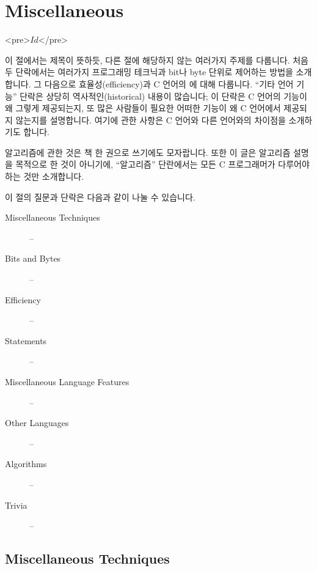 \chapter{Miscellaneous}	\label{chap:misc}

\begin{rawhtml}
<pre>$Id$</pre>
\end{rawhtml}

이 절에서는 제목이 뜻하듯, 다른 절에 해당하지 않는 여러가지 주제를
다룹니다.  처음 두 단락에서는 여러가지 프로그래밍 테크닉과 bit나 byte 단위로
제어하는 방법을 소개합니다.  그 다음으로 효율성(efficiency)과 C 언어의
에 대해 다룹니다.  ``기타 언어 기능'' 단락은 상당히
역사적인(historical) 내용이 많습니다; 이 단락은 C 언어의 기능이 왜
그렇게 제공되는지, 또 많은 사람들이 필요한 어떠한 기능이 왜 C 언어에서
제공되지 않는지를 설명합니다.  여기에 관한 사항은 C 언어와 다른 언어와의
차이점을 소개하기도 합니다.

알고리즘에 관한 것은 책 한 권으로 쓰기에도 모자랍니다.  또한 이 글은
알고리즘 설명을 목적으로 한 것이 아니기에, ``알고리즘'' 단란에서는
모든 C 프로그래머가 다루어야 하는 것만 소개합니다.  

이 절의 질문과 단락은 다음과 같이 나눌 수 있습니다.

\begin{description}
\item[Miscellaneous Techniques]          -- 
\item[Bits and Bytes]                    -- 
\item[Efficiency]                        -- 
\item[ Statements]            -- 
\item[Miscellaneous Language Features]   -- 
\item[Other Languages]                   -- 
\item[Algorithms]                        -- 
\item[Trivia]                            -- 
\end{description}

\section{Miscellaneous Techniques}	\label{sec:misctech}

